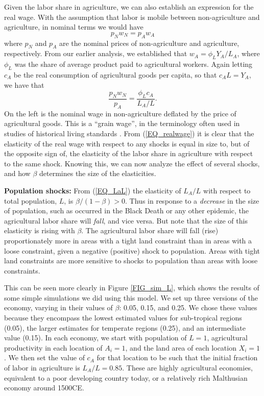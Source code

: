 \documentclass[11pt]{article}
\begin{document}
Given the labor share in agriculture, we can also establish an expression for the real wage. With the assumption that labor is mobile between non-agriculture and agriculture, in nominal terms we would have
\begin{equation}
    p_N w_N = p_A w_A
\end{equation}
where $p_N$ and $p_A$ are the nominal prices of non-agriculture and agriculture, respectively. From our earlier analysis, we established that $w_A = \phi_L Y_A/L_A$, where $\phi_L$ was the share of average product paid to agricultural workers. Again letting $c_A$ be the real consumption of agricultural goods per capita, so that $c_A L = Y_A$, we have that
\begin{equation}
    \frac{p_N w_N}{p_A} = \frac{\phi_L c_A}{L_A/L}. \label{EQ_realwage}
\end{equation}
On the left is the nominal wage in non-agriculture deflated by the price of agricultural goods. This is a ``grain wage'', in the terminology often used in studies of historical living standards \citep{allen2005,bg2006,allen11}. From (\ref{EQ_realwage}) it is clear that the elasticity of the real wage with respect to any shocks is equal in size to, but of the opposite sign of, the elasticity of the labor share in agriculture with respect to the same shock. Knowing this, we can now analyze the effect of several shocks, and how $\beta$ determines the size of the elasticities. 

\vspace{.5cm}\noindent\textbf{Population shocks:} From (\ref{EQ_LaL}) the elasticity of $L_A/L$ with respect to total population, $L$, is $\beta/(1-\beta)>0$. Thus in response to a \textit{decrease} in the size of population, such as occurred in the Black Death or any other epidemic, the agricultural labor share will \textit{fall}, and vice versa. But note that the size of this elasticity is rising with $\beta$. The agricultural labor share will fall (rise) proportionately more in areas with a tight land constraint than in areas with a loose constraint, given a negative (positive) shock to population. Areas with tight land constraints are more sensitive to shocks to population than areas with loose constraints. 

This can be seen more clearly in Figure \ref{FIG_sim_L}, which shows the results of some simple simulations we did using this model. We set up three versions of the economy, varying in their values of $\beta$: 0.05, 0.15, and 0.25. We chose these values because they encompass the lowest estimated values for sub-tropical regions (0.05), the larger estimates for temperate regions (0.25), and an intermediate value (0.15). In each economy, we start with population of $L=1$, agricultural productivity in each location of $A_i = 1$, and the land area of each location $X_i = 1$. We then set the value of $c_A$ for that location to be such that the initial fraction of labor in agriculture is $L_A/L = 0.85$. These are highly agricultural economies, equivalent to a poor developing country today, or a relatively rich Malthusian economy around 1500CE. 
\end{document}
